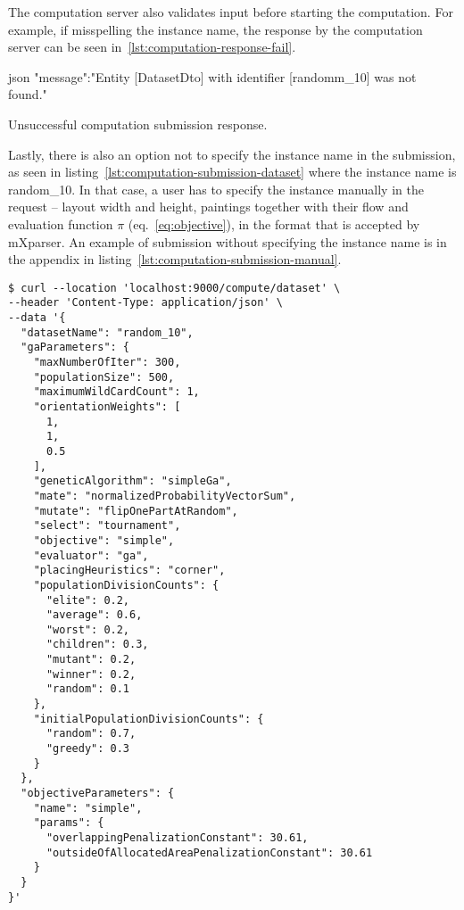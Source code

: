 The computation server also validates input before starting the computation.
For example, if misspelling the instance name, the response by the computation server can be seen in~\ref{lst:computation-response-fail}.

\begin{listing}[h!]
    \centering
    \begin{cminted}[autogobble,breaklines=true]{json}
    {
        "message":"Entity [DatasetDto] with identifier [randomm_10] was not found."
    }
    \end{cminted}
    \caption[Unsuccessful computation submission response]
    {Unsuccessful computation submission response.}
    \label{lst:computation-response-fail}
\end{listing}

Lastly, there is also an option not to specify the instance name in the submission, as seen
in listing~\ref{lst:computation-submission-dataset} where the instance name is random\_10.
In that case, a user has to specify the instance manually in the request – layout width and height,
paintings together with their flow and evaluation function $\pi$ (eq.~\ref{eq:objective}), in the format that is accepted by
mXparser\footnotemark[4].
An example of submission without specifying the instance name is in the appendix in listing~\ref{lst:computation-submission-manual}.

\begin{listing}[h!]
\centering
\begin{verbatim}
$ curl --location 'localhost:9000/compute/dataset' \
--header 'Content-Type: application/json' \
--data '{
  "datasetName": "random_10",
  "gaParameters": {
    "maxNumberOfIter": 300,
    "populationSize": 500,
    "maximumWildCardCount": 1,
    "orientationWeights": [
      1,
      1,
      0.5
    ],
    "geneticAlgorithm": "simpleGa",
    "mate": "normalizedProbabilityVectorSum",
    "mutate": "flipOnePartAtRandom",
    "select": "tournament",
    "objective": "simple",
    "evaluator": "ga",
    "placingHeuristics": "corner",
    "populationDivisionCounts": {
      "elite": 0.2,
      "average": 0.6,
      "worst": 0.2,
      "children": 0.3,
      "mutant": 0.2,
      "winner": 0.2,
      "random": 0.1
    },
    "initialPopulationDivisionCounts": {
      "random": 0.7,
      "greedy": 0.3
    }
  },
  "objectiveParameters": {
    "name": "simple",
    "params": {
      "overlappingPenalizationConstant": 30.61,
      "outsideOfAllocatedAreaPenalizationConstant": 30.61
    }
  }
}'
\end{verbatim}
\cprotect\caption[Example of computation submission with instance name]
{Example of computation submission of random\_10 instance using \verb|curl|\footnotemark[2] to a computation server running on \verb|localhost:9000|.}
\label{lst:computation-submission-dataset}
\end{listing}

\footnotetext[3]{\url{https://www.scala-sbt.org/}}
